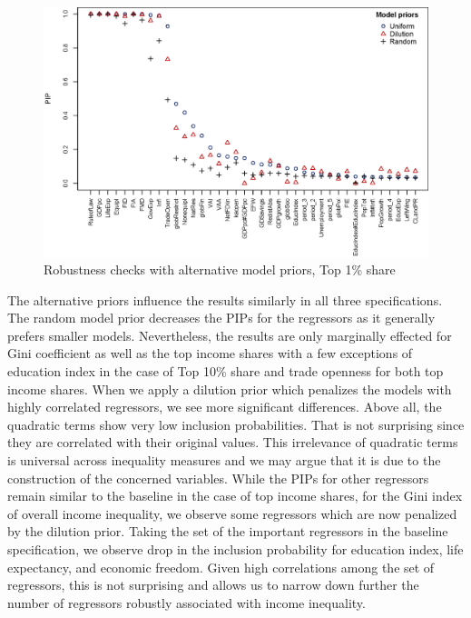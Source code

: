 \begin{refsection}
\begin{figure}[ht!]
  \caption{Robustness checks with alternative model priors, Top 1\% share}
  \label{ch4fig:top1_comp}
  \centering
  \includegraphics[width=\textwidth, keepaspectratio]{figures/ch4/model_priors_comparison_top1}
\end{figure}

The alternative priors influence the results similarly in all three specifications. The random model prior decreases the \acp{PIP} for the regressors as it generally prefers smaller models. Nevertheless, the results are only marginally effected for Gini coefficient as well as the top income shares with a few exceptions of education index in the case of Top 10\% share and trade openness for both top income shares. When we apply a dilution prior which penalizes the models with highly correlated regressors, we see more significant differences. Above all, the quadratic terms show very low inclusion probabilities. That is not surprising since they are correlated with their original values. This irrelevance of quadratic terms is universal across inequality measures and we may argue that it is due to the construction of the concerned variables. While the \acp{PIP} for other regressors remain similar to the baseline in the case of top income shares, for the Gini index of overall income inequality, we observe some regressors which are now penalized by the dilution prior. Taking the set of the important regressors in the baseline specification, we observe drop in the inclusion probability for education index, life expectancy, and economic freedom. Given high correlations among the set of regressors, this is not surprising and allows us to narrow down further the number of regressors robustly associated with income inequality.


\end{refsection}
